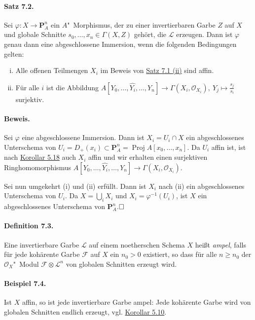 \documentclass[11pt,b5paper,openany]{memoir}
\def \qed {$\hfill\square$}
\begin{document}
\paragraph{Satz 7.2.}\label{7.2} Sei $\varphi:X\to\mathbf{P}_A^n$ ein $A$"~Morphismus, der zu einer invertierbaren Garbe $Z$ auf $X$ und globale Schnitte $s_0,\ldots,x_n\in\Gamma(X,Z)$ gehört, die $\mathcal{L}$ erzeugen. Dann ist $\varphi$ genau dann eine abgeschlossene Immersion, wenn die folgenden Bedingungen gelten:
\begin{enumerate}[(i)]
\item Alle offenen Teilmengen $X_i$ im Beweis von \hyperref[7.1]{Satz 7.1 (ii)} sind affin.
\item Für alle $i$ ist die Abbildung $A[Y_0,\ldots,\widehat{Y_i},\ldots,Y_n]\to\Gamma(X_i,\mathcal{O}_{X_i}),\ Y_j\mapsto \frac{s_j}{s_i}$ surjektiv.
\end{enumerate}

\paragraph{Beweis.} Sei $\varphi$ eine abgeschlossene Immersion. Dann ist $X_i=U_i\cap X$ ein abgeschlossenes Unterschema von $U_i=D_+(x_i)\subset\mathbf{P}_A^n=\operatorname{Proj}A[x_0,\ldots,x_n]$. Da $U_i$ affin ist, ist nach \hyperref[5.18]{Korollar 5.18} auch $X_i$ affin und wir erhalten einen surjektiven Ringhomomorphismus $A[Y_0,\ldots,\widehat{Y_i},\ldots,Y_n]\to \Gamma(X_i,\mathcal{O}_{X_i})$.

Sei nun umgekehrt (i) und (ii) erfüllt. Dann ist $X_i$ nach (ii) ein abgeschlossenes Unterschema von $U_i$. Da $X=\bigcup_i X_i$ und $X_i=\varphi^{-1}(U_i)$, ist $X$ ein abgeschlossenes Unterschema von $\mathbf{P}_A^n$.\qed

\paragraph{Definition 7.3.}\label{7.3} Eine invertierbare Garbe $\mathcal{L}$ auf einem noetherschen Schema $X$ heißt \textit{ampel}, falls für jede kohärente Garbe $\mathcal{F}$ auf $X$ ein $n_0>0$ existiert, so dass für alle $n\geq n_0$ der $\mathcal{O}_X$"~Modul $\mathcal{F}\otimes\mathcal{L}^n$ von globalen Schnitten erzeugt wird.

\paragraph{Beispiel 7.4.}\label{7.4} Ist $X$ affin, so ist jede invertierbare Garbe ampel: Jede kohärente Garbe wird von globalen Schnitten endlich erzeugt, vgl. \hyperref[5.10]{Korollar 5.10}.
\end{document}
